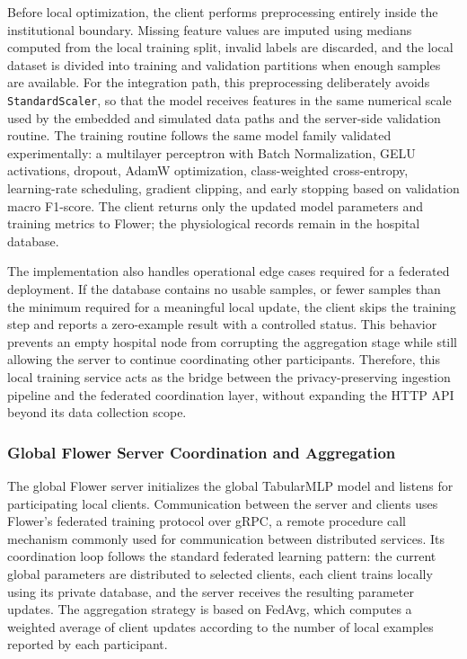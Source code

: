 \documentclass[12pt]{article}
\begin{document}
Before local optimization, the client performs preprocessing entirely inside the institutional boundary. Missing feature values are imputed using medians computed from the local training split, invalid labels are discarded, and the local dataset is divided into training and validation partitions when enough samples are available. For the integration path, this preprocessing deliberately avoids \texttt{StandardScaler}, so that the model receives features in the same numerical scale used by the embedded and simulated data paths and the server-side validation routine. The training routine follows the same model family validated experimentally: a multilayer perceptron with Batch Normalization, GELU activations, dropout, AdamW optimization, class-weighted cross-entropy, learning-rate scheduling, gradient clipping, and early stopping based on validation macro F1-score. The client returns only the updated model parameters and training metrics to Flower; the physiological records remain in the hospital database.

The implementation also handles operational edge cases required for a federated deployment. If the database contains no usable samples, or fewer samples than the minimum required for a meaningful local update, the client skips the training step and reports a zero-example result with a controlled status. This behavior prevents an empty hospital node from corrupting the aggregation stage while still allowing the server to continue coordinating other participants. Therefore, this local training service acts as the bridge between the privacy-preserving ingestion pipeline and the federated coordination layer, without expanding the HTTP API beyond its data collection scope.

\subsubsection{Global Flower Server Coordination and Aggregation}

The global Flower server initializes the global TabularMLP model and listens for participating local clients. Communication between the server and clients uses Flower's federated training protocol over gRPC, a remote procedure call mechanism commonly used for communication between distributed services. Its coordination loop follows the standard federated learning pattern: the current global parameters are distributed to selected clients, each client trains locally using its private database, and the server receives the resulting parameter updates. The aggregation strategy is based on FedAvg, which computes a weighted average of client updates according to the number of local examples reported by each participant.
\end{document}
